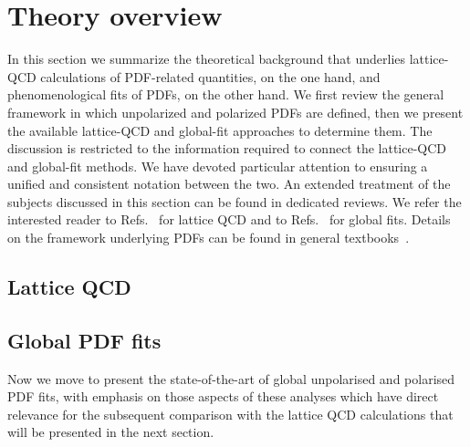 \section{Theory overview}
\label{sec:theoryoverview}

In this section we summarize the theoretical background that underlies
lattice-QCD calculations of PDF-related quantities, on the one hand, and 
phenomenological fits of PDFs, on the other hand.
%
We first review the general framework in which unpolarized and 
polarized PDFs are defined, then we present the available lattice-QCD 
and global-fit approaches to determine them. 
%
The discussion is restricted to the information required to connect the
lattice-QCD and global-fit methods.
%
We have devoted particular attention to ensuring a unified and
consistent notation between the two.
%
An extended treatment of the subjects discussed in this section
can be found in dedicated reviews.
%
We refer the interested reader to Refs.~\cite{Olive:2016xmw,Gupta:1997nd}
for lattice QCD and to Refs.~\cite{Perez:2012um,DeRoeck:2011na,Alekhin:2011sk,
Ball:2012wy,Forte:2013wc,Jimenez-Delgado:2013sma,Rojo:2015acz,
Butterworth:2015oua,Accardi:2016ndt,Gao:2017yyd} for global fits.
%
Details on the framework underlying PDFs can be found in general 
textbooks~\cite{Ellis:1991qj,Leader:2001gr,Collins:2011zzd}.



\subsection{Lattice QCD}
\label{Sec:IntroLQCD}



\subsection{Global PDF fits}
\label{Sec:IntroGlobalFits}

Now we move to present the state-of-the-art of global
unpolarised and polarised PDF fits, with emphasis on those
aspects of these analyses which have direct relevance for
the subsequent comparison with the lattice QCD calculations
that will be presented in the next section.




